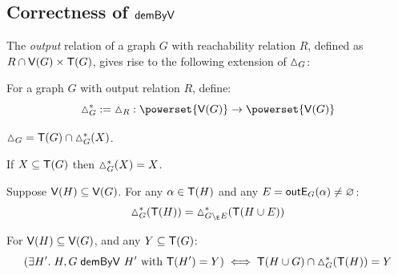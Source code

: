 \subsection{Correctness of $\mathrel{\textup{\textsf{demByV}}_{}}$}

The \emph{output} relation of a graph $G$ with reachability relation $R$, defined as $R \cap \textup{\textsf{V}}(G) \times
\mathsf{T}(G)$, gives rise to the following extension of $\demandedByR_{G}$:

\begin{definition}
   For a graph $G$ with output relation $R$, define:
   \[\demandedByR^*_G \eqdef \demandedByR_{R}: \powerset{\V(G)} \to \powerset{\V(G)}\]
\end{definition}

\begin{lemma}
   \label{lem:appendix:proof:conjugate:algorithms:demanded-cap-sinks}
   $\demandedByR_{G} = \sinks{G} \cap \demandedByR^*_{G}(X)$.
\end{lemma}

\begin{lemma}
   \label{lem:appendix:proof:conjugate:algorithms:sinks-fixpoint}
   If $X \subseteq \mathsf{T}(G)$ then $\demandedByR^*_{G}(X) = X$.
\end{lemma}

\begin{lemma}
   \label{lem:appendix:proof:conjugate:algorithms:edge-conservation}
   Suppose $\textup{\textsf{V}}(H) \subseteq \textup{\textsf{V}}(G)$. For any $\alpha \in \mathsf{T}(H)$ and any
   $E = \textup{\textsf{outE}}_{G}(\alpha) \neq \varnothing$:
   $$
      \demandedByR^*_G(\sinks{H}) = \demandedByR^*_{G \edgeMinus E} (\sinks{H \cup E})
   $$
\end{lemma}

\begin{proposition}
   \label{prop:appendix:proof:conjugate:algorithms:correctness-demByV}
   For $\textup{\textsf{V}}(H) \subseteq \textup{\textsf{V}}(G)$, and any $Y \subseteq \mathsf{T}(G)$:
   \[(\exists H'.\;H, G \demandedByV{} H'\text{ with }\sinks{H'} = Y) \iff \sinks{H \cup G} \cap \demandedByR^*_G(\sinks{H}) = Y\]
\end{proposition}

